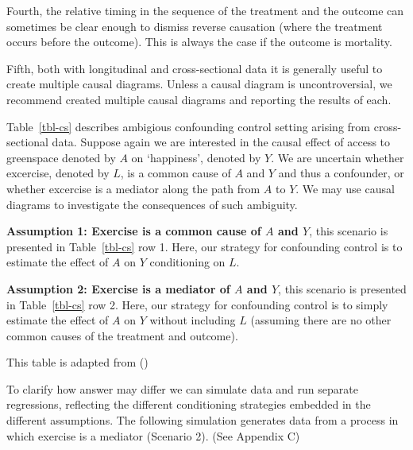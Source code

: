 \documentclass[
  singlecolumn]{article}
\begin{document}
Fourth, the relative timing in the sequence of the treatment and the
outcome can sometimes be clear enough to dismiss reverse causation
(where the treatment occurs before the outcome). This is always the case
if the outcome is mortality.

Fifth, both with longitudinal and cross-sectional data it is generally
useful to create multiple causal diagrams. Unless a causal diagram is
uncontroversial, we recommend created multiple causal diagrams and
reporting the results of each.

Table~\ref{tbl-cs} describes ambigious confounding control setting
arising from cross-sectional data. Suppose again we are interested in
the causal effect of access to greenspace denoted by \(A\) on
`happiness', denoted by \(Y\). We are uncertain whether excercise,
denoted by \(L\), is a common cause of \(A\) and \(Y\) and thus a
confounder, or whether excercise is a mediator along the path from \(A\)
to \(Y\). We may use causal diagrams to investigate the consequences of
such ambiguity.

\textbf{Assumption 1: Exercise is a common cause of \(A\) and \(Y\)},
this scenario is presented in Table~\ref{tbl-cs} row 1. Here, our
strategy for confounding control is to estimate the effect of \(A\) on
\(Y\) conditioning on \(L\).

\textbf{Assumption 2: Exercise is a mediator of \(A\) and \(Y\)}, this
scenario is presented in Table~\ref{tbl-cs} row 2. Here, our strategy
for confounding control is to simply estimate the effect of \(A\) on
\(Y\) without including \(L\) (assuming there are no other common causes
of the treatment and outcome).

\begin{table}

\caption{\label{tbl-cs}This table is adapted from
()}

\centering{

\examplecrosssection

}

\end{table}%

To clarify how answer may differ we can simulate data and run separate
regressions, reflecting the different conditioning strategies embedded
in the different assumptions. The following simulation generates data
from a process in which exercise is a mediator (Scenario 2). (See
Appendix C)
\end{document}
